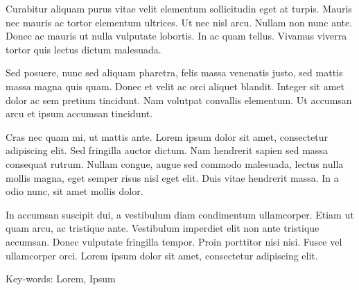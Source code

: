 
Curabitur aliquam purus vitae velit elementum sollicitudin eget at turpis. 
Mauris nec mauris ac tortor elementum ultrices. Ut nec nisl arcu. 
Nullam non nunc ante. Donec ac mauris ut nulla vulputate lobortis. 
In ac quam tellus. Vivamus viverra tortor quis lectus dictum malesuada. 

Sed posuere, nunc sed aliquam pharetra, felis massa venenatis justo, 
sed mattis massa magna quis quam. Donec et velit ac orci aliquet blandit. 
Integer sit amet dolor ac sem pretium tincidunt. Nam volutpat convallis elementum. 
Ut accumsan arcu et ipsum accumsan tincidunt.

Cras nec quam mi, ut mattis ante. Lorem ipsum dolor sit amet, consectetur adipiscing elit. 
Sed fringilla auctor dictum. Nam hendrerit sapien sed massa consequat rutrum. 
Nullam congue, augue sed commodo malesuada, lectus nulla mollis magna, eget semper risus 
nisl eget elit. Duis vitae hendrerit massa. In a odio nunc, sit amet mollis dolor. 

In accumsan suscipit dui, a vestibulum diam condimentum ullamcorper. Etiam ut quam arcu, 
ac tristique ante. Vestibulum imperdiet elit non ante tristique accumsan. Donec vulputate 
fringilla tempor. Proin porttitor nisi nisi. Fusce vel ullamcorper orci. Lorem ipsum dolor 
sit amet, consectetur adipiscing elit. 

Key-words: Lorem, Ipsum
